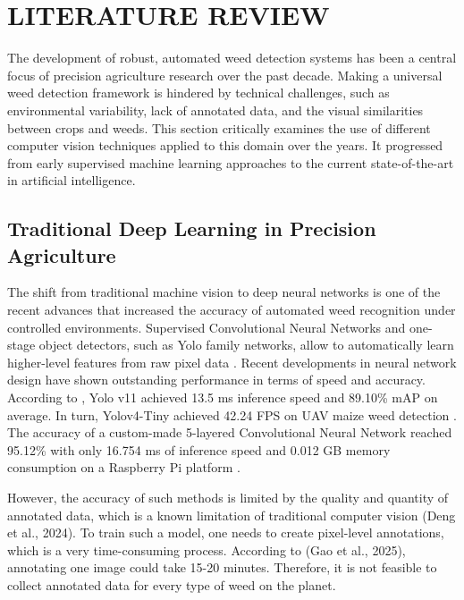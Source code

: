 \section{LITERATURE REVIEW}

The development of robust, automated weed detection systems has been a central focus of precision agriculture research over the past decade. Making a universal weed detection framework is hindered by technical challenges, such as environmental variability, lack of annotated data, and the visual similarities between crops and weeds. This section critically examines the use of different computer vision techniques applied to this domain over the years. It progressed from early supervised machine learning approaches to the current state-of-the-art in artificial intelligence.

\subsection{Traditional Deep Learning in Precision Agriculture}
The shift from traditional machine vision to deep neural networks is one of the recent advances that increased the accuracy of automated weed recognition under controlled environments. Supervised Convolutional Neural Networks and one-stage object detectors, such as Yolo family networks, allow to automatically learn higher-level features from raw pixel data \cite{abedin2026} \cite{hamrani2025}. Recent developments in neural network design have shown outstanding performance in terms of speed and accuracy. According to \cite{sharma2024}, Yolo v11 achieved 13.5 ms inference speed and 89.10\% mAP on average. In turn, Yolov4-Tiny achieved 42.24 FPS on UAV maize weed detection \cite{pei2022}. The accuracy of a custom-made 5-layered Convolutional Neural Network reached 95.12\% with only 16.754 ms of inference speed and 0.012 GB memory consumption on a Raspberry Pi platform \cite{razfar2022}.

However, the accuracy of such methods is limited by the quality and quantity of annotated data, which is a known limitation of traditional computer vision (Deng et al., 2024). To train such a model, one needs to create pixel-level annotations, which is a very time-consuming process. According to (Gao et al., 2025), annotating one image could take 15-20 minutes. Therefore, it is not feasible to collect annotated data for every type of weed on the planet.


